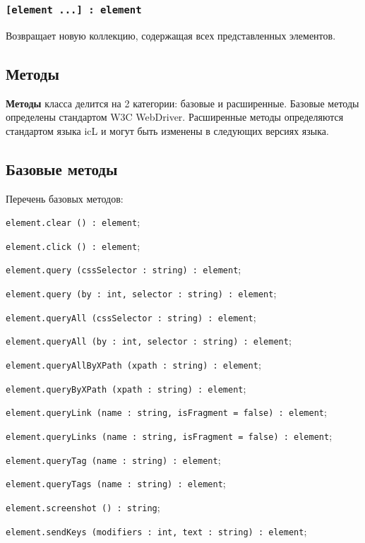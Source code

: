 \subsubsection{\lstinline|[element ...] : element|}

Возвращает новую коллекцию, содержащая всех представленных элементов.

\subsection{Методы}

{\bf Методы} класса  делится на 2 категории: базовые и расширенные. Базовые методы определены стандартом W3C WebDriver. Расширенные методы определяются стандартом языка icL и могут быть изменены в следующих версиях языка.

\subsection{Базовые методы}

Перечень базовых методов:
\begin{icItems}
    \item \lstinline|element.clear () : element|;
	\item \lstinline|element.click () : element|;
	\item \lstinline|element.query (cssSelector : string) : element|;
	\item \lstinline|element.query (by : int, selector : string) : element|;
	\item \lstinline|element.queryAll (cssSelector : string) : element|;
	\item \lstinline|element.queryAll (by : int, selector : string) : element|;
	\item \lstinline|element.queryAllByXPath (xpath : string) : element|;
	\item \lstinline|element.queryByXPath (xpath : string) : element|;
	\item \lstinline|element.queryLink (name : string, isFragment = false) : element|;
	\item \lstinline|element.queryLinks (name : string, isFragment = false) : element|;
	\item \lstinline|element.queryTag (name : string) : element|;
	\item \lstinline|element.queryTags (name : string) : element|;
	\item \lstinline|element.screenshot () : string|;
	\item \lstinline|element.sendKeys (modifiers : int, text : string) : element|;
\end{icItems}

